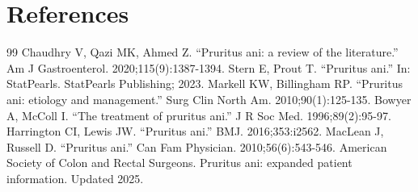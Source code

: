 \section*{References}
\begin{thebibliography}{99}
 Chaudhry V, Qazi MK, Ahmed Z. ``Pruritus ani: a review of the literature.'' Am J Gastroenterol. 2020;115(9):1387-1394.
 Stern E, Prout T. ``Pruritus ani.'' In: StatPearls. StatPearls Publishing; 2023.
 Markell KW, Billingham RP. ``Pruritus ani: etiology and management.'' Surg Clin North Am. 2010;90(1):125-135.
 Bowyer A, McColl I. ``The treatment of pruritus ani.'' J R Soc Med. 1996;89(2):95-97.
 Harrington CI, Lewis JW. ``Pruritus ani.'' BMJ. 2016;353:i2562.
 MacLean J, Russell D. ``Pruritus ani.'' Can Fam Physician. 2010;56(6):543-546.
 American Society of Colon and Rectal Surgeons. Pruritus ani: expanded patient information. Updated 2025.
\end{thebibliography}
